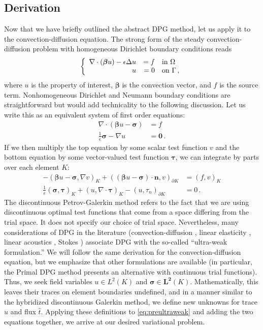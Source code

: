 \documentclass[letterpaper]{article}
\def\btau{\boldsymbol\tau}
\def\bsigma{\boldsymbol\sigma}
\def\bbeta{\boldsymbol\beta}
\newcommand{\bs}[1]{\boldsymbol{#1}}
\newcommand{\eqnref}[1]{\eqref{eq:#1}}
\newcommand{\mb}[1]{\mathbf{#1}}
\newcommand{\del}{\Delta}
\newcommand{\grad}{\nabla}
\renewcommand{\div}{\grad \cdot}
\begin{document}
\subsection{Derivation}
Now that we have briefly outlined the abstract DPG method, let us apply it to
the convection-diffusion equation. The strong form of the steady
convection-diffusion problem with homogeneous Dirichlet boundary conditions reads
\[
\left\{
\begin{array}[c]{rrl}
\div(\bs\beta u)-\epsilon\del u & =f & \text{in }\Omega\\
u & =0 & \text{on }\Gamma\,,
\end{array}
\right.
\]
where $u$ is the property of interest, $\bs\beta$ is the convection vector,
and $f$ is the source term. Nonhomogeneous Dirichlet and Neumann boundary
conditions are straightforward but would add technicality to the following
discussion. Let us write this as an equivalent system of first
order equations:
\begin{align*}
\div(\bs\beta u-\bs\sigma)&=f\\
\frac{1}{\epsilon}\bs\sigma-\grad u&=\bs0\,.
\end{align*}
If we then multiply the top equation by some scalar test function $v$ and the
bottom equation by some vector-valued test function $\btau$, we can integrate by
parts over each element $K$:
\begin{equation}
\label{eq:preultraweak}
\begin{aligned}
-(\bbeta u-\bsigma,\nabla v)_K+((\bbeta
u-\bsigma)\cdot\mathbf{n},v)_{\partial K}&=(f,v)_K\\
\frac{1}{\epsilon}(\bsigma,\btau)_K+(u,\nabla\cdot\btau)_K
-(u,\tau_n)_{\partial K}&=0\,.
\end{aligned}
\end{equation}
The discontinuous Petrov-Galerkin method refers to the fact that we are using
discontinuous optimal test functions that come from a space differing from the
trial space. It does not specify our choice of trial space. Nevertheless, many
considerations of DPG in the literature (convection-diffusion \cite{DPG6},
linear elasticity \cite{BramwellDemkowiczGopalakrishnanQiu11}, linear
acoustics \cite{DemkowiczGopalakrishnanMugaZitelli12}, Stokes
\cite{DPGStokes}) associate DPG with the so-called ``ultra-weak formulation.''
We will follow the same derivation for the convection-diffusion equation, but
we emphasize that other formulations are available (in particular, the
Primal DPG\cite{PrimalDPG} method presents an alternative with
continuous trial functions). Thus, we seek field variables $u\in L^2(K)$ and
$\bsigma\in\mb{L^2}(K)$. Mathematically, this leaves their traces on element
boundaries undefined, and in a manner similar to the hybridized discontinuous
Galerkin method, we define new unknowns for trace $\hat u$ and flux $\hat t$.
Applying these definitions to \eqnref{preultraweak} and adding the two
equations together, we arrive at our desired variational problem.
\end{document}
